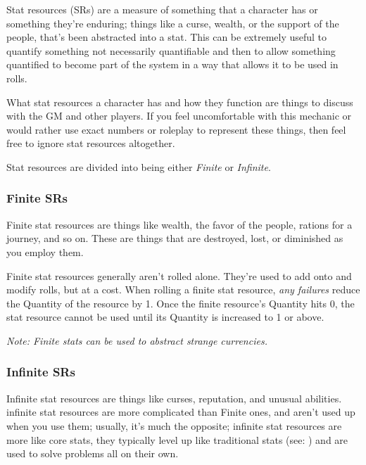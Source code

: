\documentclass[../main.tex]{subfiles}
\begin{document}
        Stat resources (SRs) are a measure of something that a character has or something they're enduring; things like a curse, wealth, or the support of the people, that's been abstracted into a stat. This can be extremely useful to quantify something not necessarily quantifiable and then to allow something quantified to become part of the system in a way that allows it to be used in rolls.
        
        What stat resources a character has and how they function are things to discuss with the GM and other players. If you feel uncomfortable with this mechanic or would rather use exact numbers or roleplay to represent these things, then feel free to ignore stat resources altogether.

        Stat resources are divided into being either \emph{Finite} or \emph{Infinite}.

        \subsubsection{Finite SRs}
        
        Finite stat resources are things like wealth, the favor of the people, rations for a journey, and so on. These are things that are destroyed, lost, or diminished as you employ them. 

        Finite stat resources generally aren't rolled alone. They're used to add onto and modify rolls, but at a cost. When rolling a finite stat resource, \emph{any failures} reduce the Quantity of the resource by 1. Once the finite resource's Quantity hits 0, the stat resource cannot be used until its Quantity is increased to 1 or above.

        \emph{Note: Finite stats can be used to abstract strange currencies.}
        \begin{mdframed}[style=Arrata]
            {\em
                \lipsum[1]
            }
        \end{mdframed}

        \subsubsection{Infinite SRs}

        Infinite stat resources are things like curses, reputation, and unusual abilities. infinite stat resources are more complicated than Finite ones, and aren't used up when you use them; usually, it's much the opposite; infinite stat resources are more like core stats, they typically level up like traditional stats (see: {}) and are used to solve problems all on their own.
\end{document}
